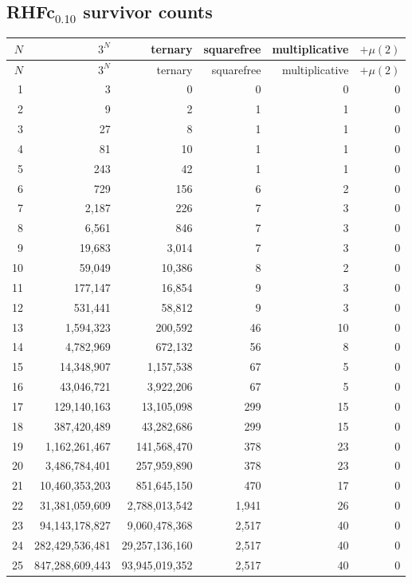 \documentclass[11pt]{article}
\begin{document}
\subsection{RHFc$_{0.10}$ survivor counts}
\begin{center}\scriptsize\begin{longtable}{r r r r r r}
\toprule $N$ & $3^N$ & ternary & squarefree & multiplicative & $+\mu(2)$\\ \midrule\endfirsthead
\toprule $N$ & $3^N$ & ternary & squarefree & multiplicative & $+\mu(2)$\\ \midrule\endhead
1 & 3 & 0 & 0 & 0 & 0\\
2 & 9 & 2 & 1 & 1 & 0\\
3 & 27 & 8 & 1 & 1 & 0\\
4 & 81 & 10 & 1 & 1 & 0\\
5 & 243 & 42 & 1 & 1 & 0\\
6 & 729 & 156 & 6 & 2 & 0\\
7 & 2{,}187 & 226 & 7 & 3 & 0\\
8 & 6{,}561 & 846 & 7 & 3 & 0\\
9 & 19{,}683 & 3{,}014 & 7 & 3 & 0\\
10 & 59{,}049 & 10{,}386 & 8 & 2 & 0\\
11 & 177{,}147 & 16{,}854 & 9 & 3 & 0\\
12 & 531{,}441 & 58{,}812 & 9 & 3 & 0\\
13 & 1{,}594{,}323 & 200{,}592 & 46 & 10 & 0\\
14 & 4{,}782{,}969 & 672{,}132 & 56 & 8 & 0\\
15 & 14{,}348{,}907 & 1{,}157{,}538 & 67 & 5 & 0\\
16 & 43{,}046{,}721 & 3{,}922{,}206 & 67 & 5 & 0\\
17 & 129{,}140{,}163 & 13{,}105{,}098 & 299 & 15 & 0\\
18 & 387{,}420{,}489 & 43{,}282{,}686 & 299 & 15 & 0\\
19 & 1{,}162{,}261{,}467 & 141{,}568{,}470 & 378 & 23 & 0\\
20 & 3{,}486{,}784{,}401 & 257{,}959{,}890 & 378 & 23 & 0\\
21 & 10{,}460{,}353{,}203 & 851{,}645{,}150 & 470 & 17 & 0\\
22 & 31{,}381{,}059{,}609 & 2{,}788{,}013{,}542 & 1{,}941 & 26 & 0\\
23 & 94{,}143{,}178{,}827 & 9{,}060{,}478{,}368 & 2{,}517 & 40 & 0\\
24 & 282{,}429{,}536{,}481 & 29{,}257{,}136{,}160 & 2{,}517 & 40 & 0\\
25 & 847{,}288{,}609{,}443 & 93{,}945{,}019{,}352 & 2{,}517 & 40 & 0\\
\bottomrule\end{longtable}\end{center}
\end{document}

